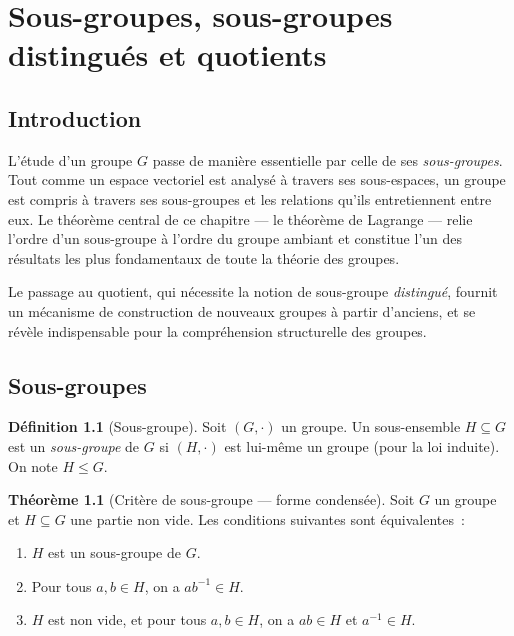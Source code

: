 \documentclass[12pt,a4paper,openany]{book}
\theoremstyle{definition}
\newtheorem{definition}{Définition}[chapter]
\newtheorem{theoreme}{Théorème}[chapter]
\begin{document}

\chapter{Sous-groupes, sous-groupes distingués et quotients}
\label{chap:sous-groupes}

\section{Introduction}
\label{sec:ch2-intro}

L'étude d'un groupe $G$ passe de manière essentielle par celle de ses
\emph{sous-groupes}. Tout comme un espace vectoriel est analysé à
travers ses sous-espaces, un groupe est compris à travers ses sous-groupes et les
relations qu'ils entretiennent entre eux. Le théorème central de ce chapitre --- le
théorème de Lagrange --- relie l'ordre d'un sous-groupe à l'ordre du groupe ambiant et
constitue l'un des résultats les plus fondamentaux de toute la théorie des groupes.

Le passage au quotient, qui nécessite la notion de sous-groupe \emph{distingué},
fournit un mécanisme de construction de nouveaux groupes à partir d'anciens, et se
révèle indispensable pour la compréhension structurelle des groupes.

\section{Sous-groupes}
\label{sec:ch2-sous-groupes}

\begin{definition}[Sous-groupe]
\label{def:sous-groupe}
Soit $(G, \cdot)$ un groupe. Un sous-ensemble $H \subseteq G$ est un \emph{sous-groupe}
de $G$ si $(H, \cdot)$ est lui-même un groupe (pour la loi induite). On note $H \leq G$.
\end{definition}

\begin{theoreme}[Critère de sous-groupe --- forme condensée]
\label{thm:critere-sg}
Soit $G$ un groupe et $H \subseteq G$ une partie non vide. Les conditions suivantes sont
équivalentes~:
\begin{enumerate}[label=(\roman*)]
  \item $H$ est un sous-groupe de $G$.
  \item Pour tous $a, b \in H$, on a $ab^{-1} \in H$.
  \item $H$ est non vide, et pour tous $a, b \in H$, on a $ab \in H$ et $a^{-1} \in H$.
\end{enumerate}
\end{theoreme}
\end{document}
